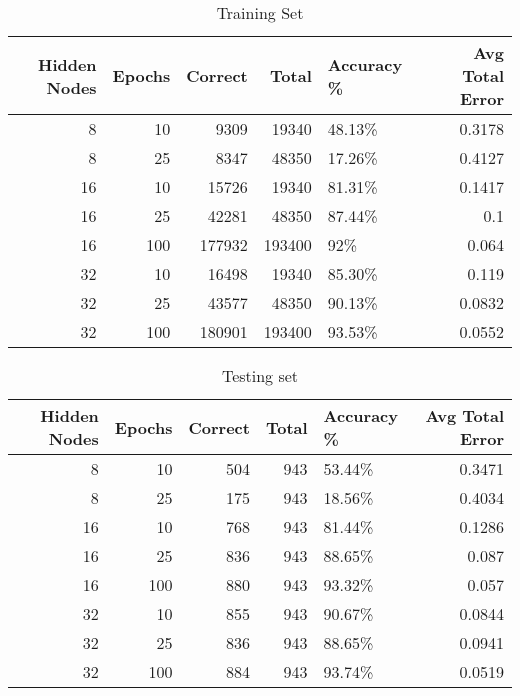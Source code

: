 \documentclass[11pt]{article}
\begin{document}
\begin{table}[htb]
\caption{Training Set}
\centering
\begin{tabular}{rrrrlr}
Hidden Nodes & Epochs & Correct & Total & Accuracy \% & Avg Total Error\\
\hline
8 & 10 & 9309 & 19340 & 48.13\% & 0.3178\\
8 & 25 & 8347 & 48350 & 17.26\% & 0.4127\\
16 & 10 & 15726 & 19340 & 81.31\% & 0.1417\\
16 & 25 & 42281 & 48350 & 87.44\% & 0.1\\
16 & 100 & 177932 & 193400 & 92\% & 0.064\\
32 & 10 & 16498 & 19340 & 85.30\% & 0.119\\
32 & 25 & 43577 & 48350 & 90.13\% & 0.0832\\
32 & 100 & 180901 & 193400 & 93.53\% & 0.0552\\
\end{tabular}
\end{table}

\begin{table}[htb]
\caption{Testing set}
\centering
\begin{tabular}{rrrrlr}
Hidden Nodes & Epochs & Correct & Total & Accuracy \% & Avg Total Error\\
\hline
8 & 10 & 504 & 943 & 53.44\% & 0.3471\\
8 & 25 & 175 & 943 & 18.56\% & 0.4034\\
16 & 10 & 768 & 943 & 81.44\% & 0.1286\\
16 & 25 & 836 & 943 & 88.65\% & 0.087\\
16 & 100 & 880 & 943 & 93.32\% & 0.057\\
32 & 10 & 855 & 943 & 90.67\% & 0.0844\\
32 & 25 & 836 & 943 & 88.65\% & 0.0941\\
32 & 100 & 884 & 943 & 93.74\% & 0.0519\\
\end{tabular}
\end{table}
\end{document}
